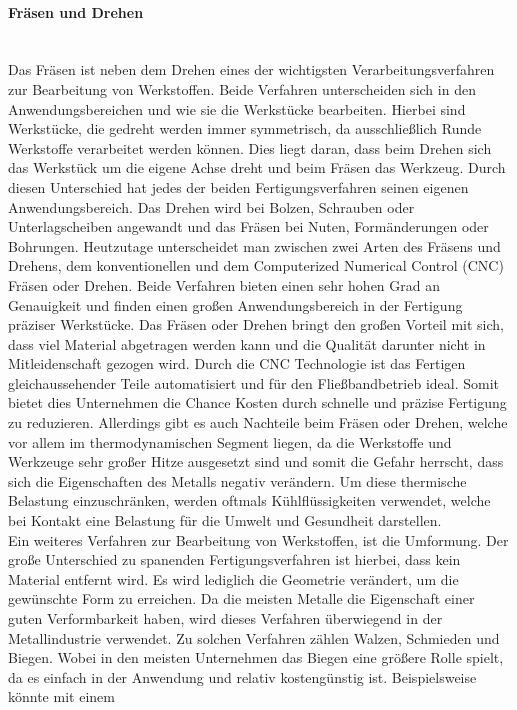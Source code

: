 \paragraph{Fräsen und Drehen}\mbox{}\\
Das Fräsen ist neben dem Drehen eines der wichtigsten Verarbeitungsverfahren zur Bearbeitung von Werkstoffen. Beide Verfahren unterscheiden sich in den 
Anwendungsbereichen und wie sie die Werkstücke bearbeiten. Hierbei sind Werkstücke, die gedreht werden immer symmetrisch, da ausschließlich Runde 
Werkstoffe verarbeitet werden können. Dies liegt daran, dass beim Drehen sich das Werkstück um die eigene Achse dreht und beim Fräsen das Werkzeug. 
Durch diesen Unterschied hat jedes der beiden Fertigungsverfahren seinen eigenen Anwendungsbereich. Das Drehen wird \zB bei Bolzen, Schrauben oder 
Unterlagscheiben angewandt und das Fräsen bei \zB Nuten, Formänderungen oder Bohrungen. Heutzutage unterscheidet man zwischen zwei Arten des Fräsens 
und Drehens, dem konventionellen und dem Computerized Numerical Control (CNC) Fräsen oder Drehen. Beide Verfahren bieten einen sehr hohen Grad an Genauigkeit 
und finden einen großen Anwendungsbereich in der Fertigung präziser Werkstücke. Das Fräsen oder Drehen bringt den großen Vorteil mit sich, dass viel Material 
abgetragen werden kann und die Qualität darunter nicht in Mitleidenschaft gezogen wird. Durch die CNC Technologie ist das Fertigen gleichaussehender Teile 
automatisiert und für den Fließbandbetrieb ideal. Somit bietet dies Unternehmen die Chance Kosten durch schnelle und präzise Fertigung zu reduzieren. 
Allerdings gibt es auch Nachteile beim Fräsen oder Drehen, welche vor allem im thermodynamischen Segment liegen, da die Werkstoffe und Werkzeuge sehr 
großer Hitze ausgesetzt sind und somit die Gefahr herrscht, dass sich die Eigenschaften \zB des Metalls negativ verändern. Um diese thermische Belastung 
einzuschränken, werden oftmals Kühlflüssigkeiten verwendet, welche bei Kontakt eine Belastung für die Umwelt und Gesundheit darstellen. %
\\
Ein weiteres Verfahren zur Bearbeitung von Werkstoffen, ist die Umformung. Der große Unterschied zu spanenden Fertigungsverfahren ist hierbei, dass kein 
Material entfernt wird. Es wird lediglich die Geometrie verändert, um die gewünschte Form zu erreichen. Da die meisten Metalle die Eigenschaft einer guten 
Verformbarkeit haben, wird dieses Verfahren überwiegend in der Metallindustrie verwendet. Zu solchen Verfahren zählen \zB Walzen, Schmieden und Biegen. Wobei 
in den meisten Unternehmen das Biegen eine größere Rolle spielt, da es einfach in der Anwendung und relativ kostengünstig ist. Beispielsweise könnte mit einem 
